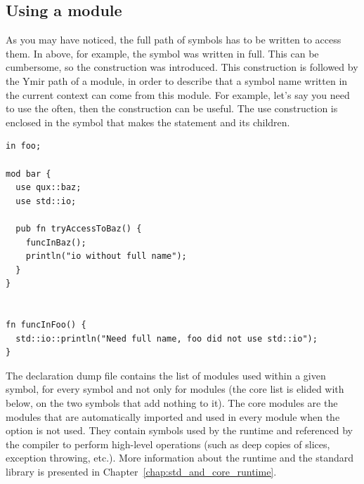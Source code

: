 
\subsection {Using a module}

As you may have noticed, the full path of symbols has to be written to access
them. In  above, for example, the symbol
 was written in full. This can be cumbersome, so the
construction  was introduced. This construction is followed by the
Ymir path of a module, in order to describe that a symbol name written in the
current context can come from this module. For example, let's say you need to
use the  often, then the  construction can
be useful. The use construction is enclosed in the symbol that makes the
statement and its children.

\begin{lstlisting}[caption=\textit{./foo.yr}, style=coloredverbatim]
in foo;

mod bar {
  use qux::baz;
  use std::io;

  pub fn tryAccessToBaz() {
    funcInBaz();
    println("io without full name");
  }
}


fn funcInFoo() {
  std::io::println("Need full name, foo did not use std::io");
}
\end{lstlisting}

The declaration dump file  contains the list of
modules used within a given symbol, for every symbol and not only for modules
(the core list is elided with  below, on the two symbols that add
nothing to it). The core modules are the modules that are
automatically imported and used in every module when the 
option is not used. They contain symbols used by the runtime and referenced by
the compiler to perform high-level operations (such as deep copies of slices,
exception throwing, etc.). More information about the runtime and the standard
library is presented in Chapter~\ref{chap:std_and_core_runtime}.

